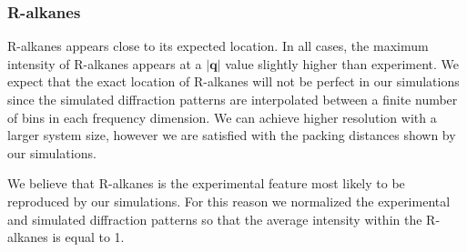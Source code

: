 \documentclass[journal=jpcbfk,manuscript=article]{achemso}
\begin{document}
%

  \subsubsection{R-alkanes}\label{section:ralkanes}
  
  R-alkanes appears close to its expected location. In all cases, the maximum intensity
  of R-alkanes appears at a $|\mathbf{q}|$ value slightly higher than experiment. 
  We expect that the exact location of R-alkanes will not be perfect in our simulations
  since the simulated diffraction patterns are interpolated between a finite number of
  bins in each frequency dimension. We can achieve higher resolution with a larger
  system size, however we are satisfied with the packing distances shown by our simulations.
  
  We believe that R-alkanes is the experimental feature most likely to be reproduced by
  our simulations. For this reason we normalized the experimental and simulated diffraction
  patterns so that the average intensity within the R-alkanes is equal to 1. 
\end{document}
